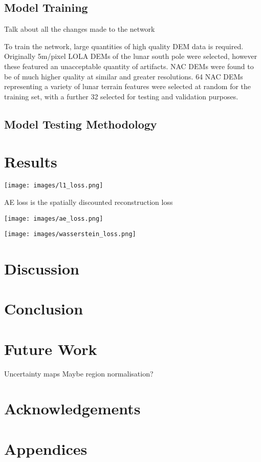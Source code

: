 \documentclass[twocolumn]{article}
\begin{document}
\subsection{Model Training}
\label{sec:org0222e8a}
Talk about all the changes made to the network

To train the network, large quantities of high quality DEM data is required.
Originally 5m/pixel LOLA DEMs of the lunar south pole were selected, however these featured an unacceptable quantity of artifacts.
NAC DEMs were found to be of much higher quality at similar and greater resolutions.
64 NAC DEMs\autocite{LROCRDRProduct} representing a variety of lunar terrain features were selected at random for the training set, with a further 32 selected for testing and validation purposes.
\subsection{Model Testing Methodology}
\label{sec:orgfb486db}


\section{Results}
\label{sec:org9c45861}

\begin{center}
\texttt{[image: images/l1\_loss.png]}
\end{center}

AE loss is the spatially discounted reconstruction loss\autocite{zhangVoidFillingBased2020}
\begin{center}
\texttt{[image: images/ae\_loss.png]}
\end{center}

\begin{center}
\texttt{[image: images/wasserstein\_loss.png]}
\end{center}


\section{Discussion}
\label{sec:org2651acb}

\section{Conclusion}
\label{sec:orgf61a4d1}

\section{Future Work}
\label{sec:org8f2275d}

Uncertainty maps
Maybe region normalisation?\autocite{yuRegionNormalizationImage2023}

\section*{Acknowledgements}

\printbibliography

\section*{Appendices}
\end{document}
